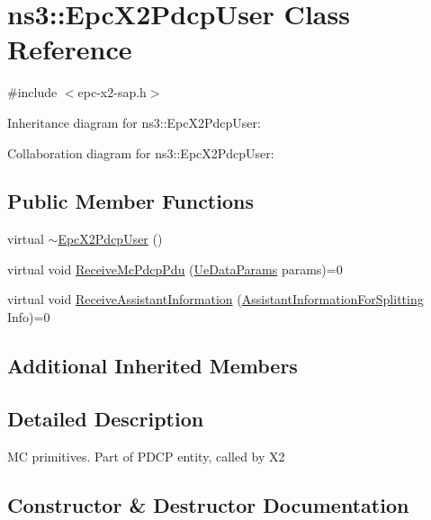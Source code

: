 \hypertarget{classns3_1_1EpcX2PdcpUser}{}\section{ns3\+:\+:Epc\+X2\+Pdcp\+User Class Reference}
\label{classns3_1_1EpcX2PdcpUser}


{\ttfamily \#include $<$epc-\/x2-\/sap.\+h$>$}



Inheritance diagram for ns3\+:\+:Epc\+X2\+Pdcp\+User\+:


Collaboration diagram for ns3\+:\+:Epc\+X2\+Pdcp\+User\+:
\subsection*{Public Member Functions}
\begin{DoxyCompactItemize}
\item 
virtual \hyperlink{classns3_1_1EpcX2PdcpUser_aabcc406612820098535b5c2560957861}{$\sim$\+Epc\+X2\+Pdcp\+User} ()
\item 
virtual void \hyperlink{classns3_1_1EpcX2PdcpUser_a870fce98cffe8e466c65102e993dd354}{Receive\+Mc\+Pdcp\+Pdu} (\hyperlink{structns3_1_1EpcX2Sap_1_1UeDataParams}{Ue\+Data\+Params} params)=0
\item 
virtual void \hyperlink{classns3_1_1EpcX2PdcpUser_adb870bc1dddfed15c5f2faba9c0cfb43}{Receive\+Assistant\+Information} (\hyperlink{structns3_1_1EpcX2Sap_1_1AssistantInformationForSplitting}{Assistant\+Information\+For\+Splitting} Info)=0
\end{DoxyCompactItemize}
\subsection*{Additional Inherited Members}


\subsection{Detailed Description}
MC primitives. Part of P\+D\+CP entity, called by X2 

\subsection{Constructor \& Destructor Documentation}
